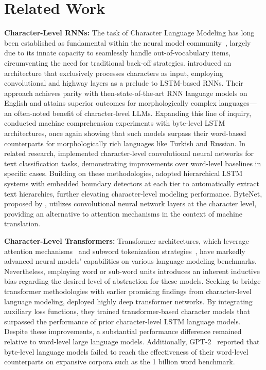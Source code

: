 \section{Related Work}
\label{section:related_work}

\textbf{Character-Level RNNs:} The task of Character Language Modeling has long been established as fundamental within the neural model community~\citep{sutskever2011generating,mikolov2012subword,graves2013generating}, largely due to its innate capacity to seamlessly handle out-of-vocabulary items, circumventing the need for traditional back-off strategies. \cite{kim2016character} introduced an architecture that exclusively processes characters as input, employing convolutional and highway layers as a prelude to LSTM-based RNNs. Their approach achieves parity with then-state-of-the-art RNN language models on English and attains superior outcomes for morphologically complex languages—an often-noted benefit of character-level LLMs. Expanding this line of inquiry, \cite{kenter2018byte} conducted machine comprehension experiments with byte-level LSTM architectures, once again showing that such models surpass their word-based counterparts for morphologically rich languages like Turkish and Russian. In related research, \cite{zhang2015character} implemented character-level convolutional neural networks for text classification tasks, demonstrating improvements over word-level baselines in specific cases. Building on these methodologies, \citet{chung2019hierarchical} adopted hierarchical LSTM systems with embedded boundary detectors at each tier to automatically extract text hierarchies, further elevating character-level modeling performance. ByteNet, proposed by \cite{kalchbrenner2016neural}, utilizes convolutional neural network layers at the character level, providing an alternative to attention mechanisms in the context of machine translation.

\textbf{Character-Level Transformers:} Transformer architectures, which leverage attention mechanisms~\citep{vaswani2017attention} and subword tokenization strategies~\citep{sennrich-etal-2016-neural}, have markedly advanced neural models' capabilities on various language modeling benchmarks. Nevertheless, employing word or sub-word units introduces an inherent inductive bias regarding the desired level of abstraction for these models. Seeking to bridge transformer methodologies with earlier promising findings from character-level language modeling, \citet{al2019character} deployed highly deep transformer networks. By integrating auxiliary loss functions, they trained transformer-based character models that surpassed the performance of prior character-level LSTM language models. Despite these improvements, a substantial performance difference remained relative to word-level large language models. Additionally, GPT-2~\citep{radfordgpt2} reported that byte-level language models failed to reach the effectiveness of their word-level counterparts on expansive corpora such as the 1 billion word benchmark.

